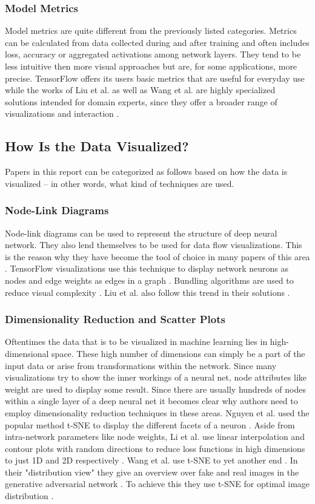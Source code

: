 \documentclass{acmsiggraph}               %
\begin{document}
\subsubsection{Model Metrics}
Model metrics are quite different from the previously listed categories. Metrics can be calculated from data collected during and after training and often includes loss, accuracy or aggregated activations among network layers. They tend to be less intuitive then more visual approaches but are, for some applications, more precise. TensorFlow \cite{Wongsuphasawat2018} offers its users basic metrics that are useful for everyday use while the works of Liu et al. as well as Wang et al. are highly specialized solutions intended for domain experts, since they offer a broader range of visualizations and interaction \cite{Liu2016,Liu2018,Wang}.

\subsection{How Is the Data Visualized?}
Papers in this report can be categorized as follows based on how the data is visualized -- in other words, what kind of techniques are used.
\subsubsection{Node-Link Diagrams}
Node-link diagrams can be used to represent the structure of deep neural network. They also lend themselves to be used for data flow visualizations. This is the reason why they have become the tool of choice in many papers of this area \cite{Hohman2018}. TensorFlow visualizations use this technique to display network neurons as nodes and edge weights as edges in a graph \cite{Wongsuphasawat2018}. Bundling algorithms are used to reduce visual complexity \cite{Hohman2018,Wongsuphasawat2018}. Liu et al. also follow this trend in their solutions \cite{Liu2016,Liu2018}.
\subsubsection{Dimensionality Reduction and Scatter Plots}
Oftentimes the data that is to be visualized in machine learning lies in high-dimensional space. These high number of dimensions can simply be a part of the input data or arise from transformations within the network. Since many visualizations try to show the inner workings of a neural net, node attributes like weight are used to display some result. Since there are usually hundreds of nodes within a single layer of a deep neural net it becomes clear why authors need to employ dimensionality reduction techniques in these areas.
Nguyen et al. used the popular method t-SNE to display the different facets of a neuron \cite{Nguyen2016}. 
Aside from intra-network parameters like node weights, Li et al. use linear interpolation and contour plots with random directions to reduce loss functions in high dimensions to just 1D and 2D respectively \cite{Li2017}.
Wang et al. use t-SNE to yet another end \cite{Wang}. In their "distribution view" they give an overview over fake and real images in the generative adversarial network \cite{Wang}. To achieve this they use t-SNE for optimal image distribution \cite{Wang}. 
\end{document}
